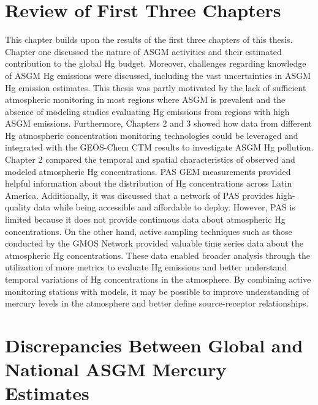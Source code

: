 \begin{flushleft}
\begin{flushleft}
\end{flushleft}
\section{Review of First Three Chapters}\label{recap}
This chapter builds upon the results of the first three chapters of this thesis. Chapter one discussed the nature of ASGM activities and their estimated contribution to the global Hg budget. Moreover, challenges regarding knowledge of ASGM Hg emissions were discussed, including the vast uncertainties in ASGM Hg emission estimates. This thesis was partly motivated by the lack of sufficient atmospheric monitoring in most regions where ASGM is prevalent and the absence of modeling studies evaluating Hg emissions from regions with high ASGM emissions. Furthermore, Chapters 2 and 3 showed how data from different Hg atmospheric concentration monitoring technologies could be leveraged and integrated with the GEOS-Chem CTM results to investigate ASGM Hg pollution. Chapter 2 compared the temporal and spatial characteristics of observed and modeled atmospheric Hg concentrations. PAS GEM measurements provided helpful information about the distribution of Hg concentrations across Latin America. Additionally, it was discussed that a network of PAS provides high-quality data while being accessible and affordable to deploy. However, PAS is limited because it does not provide continuous data about atmospheric Hg concentrations. On the other hand, active sampling techniques  such as those conducted by the GMOS Network provided valuable time series data about the atmospheric Hg concentrations. These data enabled broader analysis through the utilization of more metrics to evaluate Hg emissions and better understand temporal variations of Hg concentrations in the atmosphere. By combining active monitoring stations with models, it may be possible to improve understanding of mercury levels in the atmosphere and better define source-receptor relationships. 
\end{flushleft}



\section{Discrepancies Between Global and National ASGM Mercury Estimates}\label{nap_gma18_differences}

